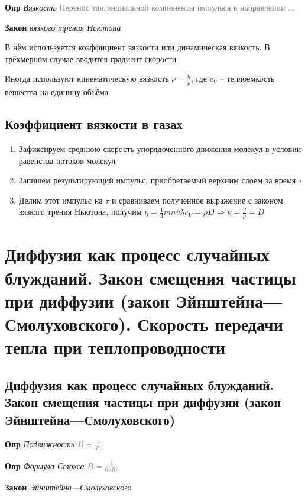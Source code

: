 \documentclass[a4paper, 14pt]{article}
\begin{document}
    \textbf{Опр} \textit{Вязкость} \textcolor{gray}{Перенос тангенциальной компоненты импульса в направлении ...}
    
    \textbf{Закон} \textit{вязкого трения Ньютона}
    
    В нём используется коэффициент вязкости или динамическая вязкость.
    В трёхмерном случае вводится градиент скорости
    
    Иногда используют кинематическую вязкость $\nu = \frac{\eta}{\rho}$, где $c_V$ -- теплоёмкость вещества на
    единицу объёма
    
    \subsection{Коэффициент вязкости в газах}
    
    \begin{enumerate}
        \item Зафиксируем среднюю скорость упорядоченного движения молекул в условии равенства потоков молекул
        \item Запишем результирующий импульс, приобретаемый верхним слоем за время $\tau$
        \item Делим этот импульс на $\tau$ и сравниваем полученное выражение с законом вязкого трения Ньютона,
        получим $\eta = \frac{1}{3} mn \overline{v} \lambda c_V = \rho D \Rightarrow \nu = \frac{\eta}{\rho} = D$
    \end{enumerate}
    
    \section{Диффузия как процесс случайных блужданий. Закон смещения частицы при диффузии (закон
    Эйнштейна—Смолуховского).
    Скорость передачи тепла при теплопроводности}
    
    \subsection{Диффузия как процесс случайных блужданий. Закон смещения частицы при диффузии (закон
    Эйнштейна—Смолуховского)}
    
    \textbf{Опр} \textit{Подвижность} \textcolor{gray}{$B = \frac{\overline{v}}{F_{fr}}$}
    
    \textbf{Опр} \textit{Формула Стокса} \textcolor{gray}{$B = \frac{1}{6 \pi R \eta}$}
    
    \textbf{Закон} \textit{Эйнштейна—Смолуховского}
    
\end{document}
